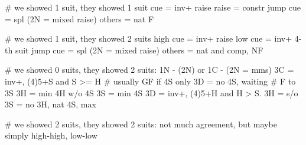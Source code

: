 # we showed 1 suit, they showed 1 suit
cue = inv+ raise
raise = constr
jump cue = spl
(2N = mixed raise)
others = nat F

# we showed 1 suit, they showed 2 suits
high cue = inv+ raise
low cue = inv+ 4-th suit
jump cue = spl
(2N = mixed raise)
others = nat and comp, NF

# we showed 0 suits, they showed 2 suits: 1N - (2N) or 1C - (2N = mms)
3C = inv+, (4)5+S and S >= H  # usually GF if 4S only
    3D = no 4S, waiting  # F to 3S
    3H = min 4H w/o 4S
    3S = min 4S
3D = inv+, (4)5+H and H > S.
    3H = s/o
    3S = no 3H, nat 4S, max

# we showed 2 suits, they showed 2 suits: 
not much agreement, but maybe simply high-high, low-low